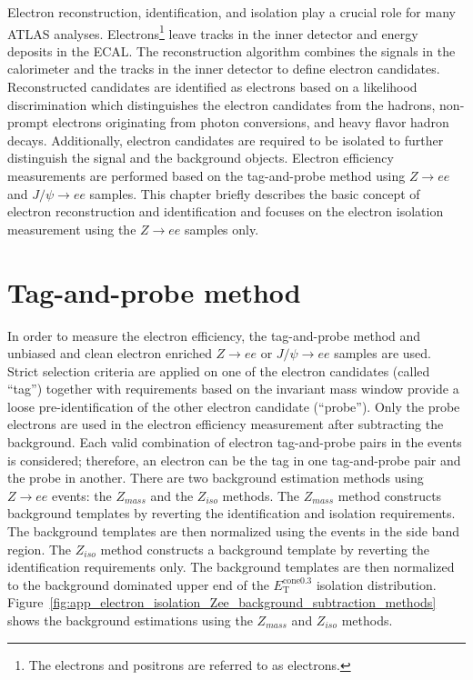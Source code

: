 Electron reconstruction, identification, and isolation play a crucial role for many ATLAS analyses.
Electrons\footnote{The electrons and positrons are referred to as electrons.} leave tracks in the inner detector and energy deposits in the ECAL.
The reconstruction algorithm combines the signals in the calorimeter and the tracks in the inner detector to define electron candidates.
Reconstructed candidates are identified as electrons based on a likelihood discrimination which distinguishes the electron candidates from the hadrons, non-prompt electrons originating from photon conversions, and heavy flavor hadron decays.
Additionally, electron candidates are required to be isolated to further distinguish the signal and the background objects.
Electron efficiency measurements are performed based on the tag-and-probe method using $Z \to ee$ and $J/\psi \to ee$ samples.
This chapter briefly describes the basic concept of electron reconstruction and identification and focuses on the electron isolation measurement using the $Z \to ee$ samples only.


\section{Tag-and-probe method}
\label{sec:app_tag_and_probe_method}
In order to measure the electron efficiency, the tag-and-probe method and unbiased and clean electron enriched $Z \to ee$ or $J/\psi \to ee$ samples are used.
Strict selection criteria are applied on one of the electron candidates (called ``tag'') together with requirements based on the invariant mass window provide a loose pre-identification of the other electron candidate (``probe'').
Only the probe electrons are used in the electron efficiency measurement after subtracting the background.
Each valid combination of electron tag-and-probe pairs in the events is considered; therefore, an electron can be the tag in one tag-and-probe pair and the probe in another.
There are two background estimation methods using $Z \to ee$ events: the $Z_{mass}$ and the $Z_{iso}$ methods.
The $Z_{mass}$ method constructs background templates by reverting the identification and isolation requirements.
The background templates are then normalized using the events in the side band region.
The $Z_{iso}$ method constructs a background template by reverting the identification requirements only.
The background templates are then normalized to the background dominated upper end of the $E_\mathrm{T}^\mathrm{cone0.3}$ isolation distribution.
Figure~\ref{fig:app_electron_isolation_Zee_background_subtraction_methods} shows the background estimations using the $Z_{mass}$ and $Z_{iso}$ methods.

